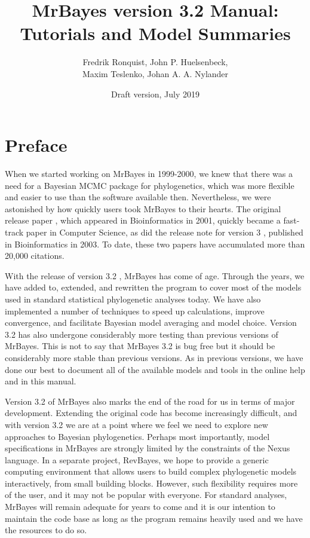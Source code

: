 \documentclass[12pt]{book}
\begin{document}
\title{MrBayes version 3.2 Manual: \\ Tutorials and Model Summaries}

\date{\large Draft version, July 2019}

\author{Fredrik Ronquist, John P. Huelsenbeck, \\ Maxim Teslenko, Johan A. A. Nylander}

\maketitle

\tableofcontents

\newpage

\frontmatter

\chapter{Preface}
\label{preface}

When we started working on MrBayes in 1999-2000, we knew that there was a need for a Bayesian MCMC
package for phylogenetics, which was more flexible and easier to use than the software available
then. Nevertheless, we were astonished by how quickly users took MrBayes to their hearts. The
original release paper \citep{huelsenbeck01c}, which appeared in Bioinformatics in 2001, quickly
became a fast-track paper in Computer Science, as did the release note for version 3
\citep{ronquist03}, published in Bioinformatics in 2003. To date, these two papers have accumulated
more than 20,000 citations.

With the release of version 3.2 \citep{ronquist12a}, MrBayes has come of age. Through the years, we
have added to, extended, and rewritten the program to cover most of the models used in standard
statistical phylogenetic analyses today. We have also implemented a number of techniques to speed
up calculations, improve convergence, and facilitate Bayesian model averaging and model choice.
Version 3.2 has also undergone considerably more testing than previous versions of MrBayes. This
is not to say that MrBayes 3.2 is bug free but it should be considerably more stable than previous
versions. As in previous versions, we have done our best to document all of the available models
and tools in the online help and in this manual.

Version 3.2 of MrBayes also marks the end of the road for us in terms of major development.
Extending the original code has become increasingly difficult, and with version 3.2 we are at a
point where we feel we need to explore new approaches to Bayesian phylogenetics. Perhaps most
importantly, model specifications in MrBayes are strongly limited by the constraints of the Nexus
language. In a separate project, RevBayes, we hope to provide a generic computing environment that
allows users to build complex phylogenetic models interactively, from small building blocks.
However, such flexibility requires more of the user, and it may not be popular with everyone. For
standard analyses, MrBayes will remain adequate for years to come and it is our intention to
maintain the code base as long as the program remains heavily used and we have the resources to do
so.
\end{document}
